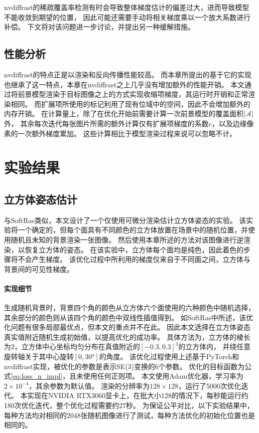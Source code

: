 nvdiffrast的稀疏覆盖率检测有时会导致整体梯度估计的偏差过大，进而导致模型不能收敛到期望的位置，
因此可能还需要手动将相关梯度乘以一个放大系数进行补偿。
下文将对该问题进一步讨论，并提出另一种缓解措施。

\subsection{性能分析}

nvdiffrast的特点正是以渲染和反向传播性能较高。
而本章所提出的基于它的实现也继承了这一特点，本章在nvdiffrast之上几乎没有增加额外的性能开销。
本文通过将前景模型渲染于目标图像之上的方式实现收缩项梯度，其运行时开销和正常渲染相同。
而扩展项所使用的标记利用了现有位域中的空间，因此不会增加额外的内存开销。
在计算量上，除了在优化开始前需要计算一次前景模型的覆盖面积$|\mathcal{A}|$外，
其余每次迭代每张图片所需的额外计算仅有扩展项梯度的系数$e$，以及边缘像素的一次额外梯度累加。
这些计算相比于模型渲染过程来说可以忽略不计。

\section{实验结果}

\subsection{立方体姿态估计}

与SoftRas\citep{softras}类似，本文设计了一个仅使用可微分渲染估计立方体姿态的实验。
该实验将一个确定的，但每个面具有不同颜色的立方体放置在场景中的随机位置，并使用随机且未知的背景渲染一张图像。
然后使用本章所述的方法对该图像进行逆渲染，以恢复立方体的姿态。
在该实验中，立方体每个面均是纯色，因此着色的步骤将不会产生梯度。
该优化过程中所利用的梯度仅来自于不同面之间，立方体与背景间的可见性梯度。

\paragraph{实现细节}
生成随机背景时，背景四个角的颜色从立方体六个面使用的六种颜色中随机选择，
其余部分的颜色则从该四个角的颜色中双线性插值得到。
如SoftRas中所述，该优化问题有很多局部最优点，但本文的重点并不在此。
因此本文选择在立方体姿态真实值附近随机生成初始值，以提高优化的成功率。
具体方法为，立方体的棱长为$2$，立方体中心坐标均匀分布在真值附近的$[-0.3,0.3]^3$的立方体内，
并绕任意旋转轴关于其中心旋转$[0,30°]$的角度。
该优化过程使用上述基于PyTorch\citep{pytorch}和nvdiffrast实现，被优化的参数是表示SE(3)变换的6个参数。
优化的目标函数为公式\eqref{eq:loss_n_impl}，且未使用任何正则项。
本文使用Adam\citep{adam}优化器，学习率为$2\times 10^{-4}$，其余参数为默认值。
渲染的分辨率为$128\times128$，运行了5000次优化迭代。
本实现在NVIDIA RTX3060显卡上，在批大小128的情况下，每秒能运行约180次优化迭代，整个优化过程需要约27秒。
为保证公平对比，以下实验结果中，每种方法均对相同的2048张随机图像进行了测试，每种方法优化的初始化位置也是相同的。

